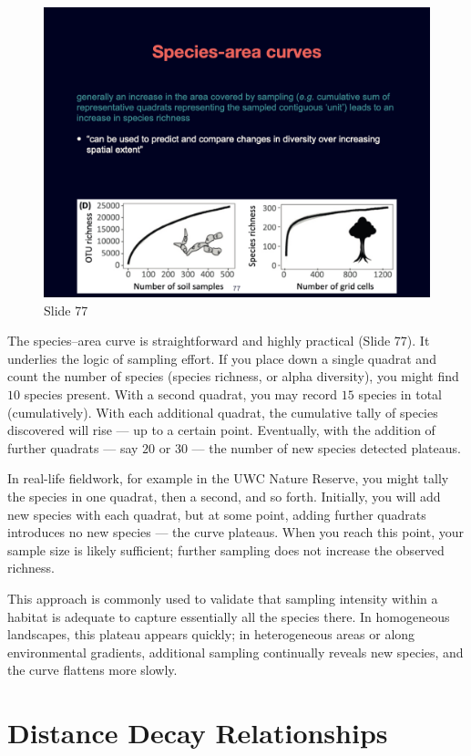 \documentclass[
  11pt,
]{book}
\begin{document}
\begin{figure}[ht]
\centering
\includegraphics[width=0.8\linewidth]{../images/BDC334/BDC334-077.jpeg}
\caption*{Slide 77}
\end{figure}

The species--area curve is straightforward and highly practical (Slide
77). It underlies the logic of sampling effort. If you place down a
single quadrat and count the number of species (species richness, or
alpha diversity), you might find \(10\) species present. With a second
quadrat, you may record \(15\) species in total (cumulatively). With
each additional quadrat, the cumulative tally of species discovered will
rise --- up to a certain point. Eventually, with the addition of further
quadrats --- say \(20\) or \(30\) --- the number of new species detected
plateaus.

In real-life fieldwork, for example in the UWC Nature Reserve, you might
tally the species in one quadrat, then a second, and so forth.
Initially, you will add new species with each quadrat, but at some
point, adding further quadrats introduces no new species --- the curve
plateaus. When you reach this point, your sample size is likely
sufficient; further sampling does not increase the observed richness.

This approach is commonly used to validate that sampling intensity
within a habitat is adequate to capture essentially all the species
there. In homogeneous landscapes, this plateau appears quickly; in
heterogeneous areas or along environmental gradients, additional
sampling continually reveals new species, and the curve flattens more
slowly.

\section{Distance Decay
Relationships}\label{distance-decay-relationships}
\end{document}
